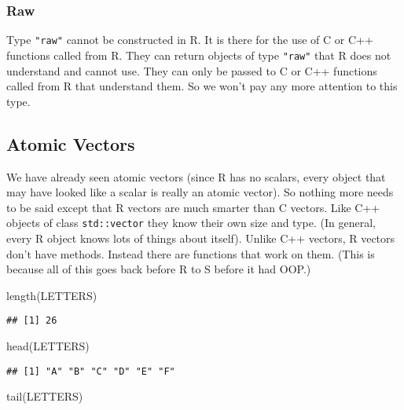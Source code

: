 \documentclass[
]{article}
\newenvironment{Shaded}{\begin{snugshade}}{\end{snugshade}}
\newcommand{\FunctionTok}[1]{\textcolor[rgb]{0.00,0.00,0.00}{#1}}
\newcommand{\NormalTok}[1]{#1}
\begin{document}
\hypertarget{raw}{%
\subsubsection{Raw}\label{raw}}

Type \texttt{"raw"} cannot be constructed in R. It is there for the use
of C or C++ functions called from R. They can return objects of type
\texttt{"raw"} that R does not understand and cannot use. They can only
be passed to C or C++ functions called from R that understand them. So
we won't pay any more attention to this type.

\hypertarget{atomic-vectors}{%
\subsection{Atomic Vectors}\label{atomic-vectors}}

We have already seen atomic vectors (since R has no scalars, every
object that may have looked like a scalar is really an atomic vector).
So nothing more needs to be said except that R vectors are much smarter
than C vectors. Like C++ objects of class \texttt{std::vector} they know
their own size and type. (In general, every R object knows lots of
things about itself). Unlike C++ vectors, R vectors don't have methods.
Instead there are functions that work on them. (This is because all of
this goes back before R to S before it had OOP.)

\begin{Shaded}
\begin{Highlighting}[]
\FunctionTok{length}\NormalTok{(LETTERS)}
\end{Highlighting}
\end{Shaded}

\begin{verbatim}
## [1] 26
\end{verbatim}

\begin{Shaded}
\begin{Highlighting}[]
\FunctionTok{head}\NormalTok{(LETTERS)}
\end{Highlighting}
\end{Shaded}

\begin{verbatim}
## [1] "A" "B" "C" "D" "E" "F"
\end{verbatim}

\begin{Shaded}
\begin{Highlighting}[]
\FunctionTok{tail}\NormalTok{(LETTERS)}
\end{Highlighting}
\end{Shaded}
\end{document}
